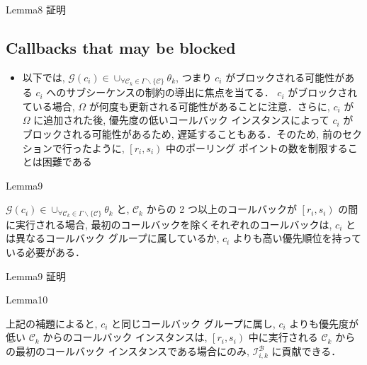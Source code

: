 \begin{frame}{Lemma8 証明}
    \todo{}
\end{frame}


\subsection{Callbacks that may be blocked}
\label{ssec: callbacks_that_may_be_blocked}

\begin{frame}{}
\begin{itemize}
    \item 以下では, $\mathcal{G}\left(c_{i}\right) \in \cup_{\forall \mathcal{C}_{k} \in \Gamma \backslash\{\mathcal{C}\}} \theta_{k}$, つまり $c_{i}$ がブロックされる可能性がある $c_{i}$ へのサブシーケンスの制約の導出に焦点を当てる． $c_{i}$ がブロックされている場合, $\Omega$ が何度も更新される可能性があることに注意．さらに, $c_{i}$ が $\Omega$ に追加された後, 優先度の低いコールバック インスタンスによって $c_{i}$ がブロックされる可能性があるため, 遅延することもある．そのため, 前のセクションで行ったように, $\left[r_{i}, s_{i}\right)$ 中のポーリング ポイントの数を制限することは困難である
\end{itemize}
\end{frame}

\begin{frame}{Lemma9}
\begin{lemma}[]
    $\mathcal{G}\left(c_{i}\right) \in \cup_{\forall \mathcal{C}_{k} \in \Gamma \backslash\{\mathcal{C}\}} \theta_{k}$ と, $\mathcal{C}_{k}$ からの 2 つ以上のコールバックが $\left[r_{i}, s_{i}\right)$ の間に実行される場合, 最初のコールバックを除くそれぞれのコールバックは, $c_{i}$ とは異なるコールバック グループに属しているか, $c_{i}$ よりも高い優先順位を持っている必要がある．
\end{lemma}
\end{frame}

\begin{frame}{Lemma9 証明}
\todo{}
\end{frame}

\begin{frame}{Lemma10}
\begin{lemma}[]
    上記の補題によると, $c_{i}$ と同じコールバック グループに属し, $c_{i}$ よりも優先度が低い $\mathcal{C}_{k}$ からのコールバック インスタンスは, $\left[r_{i}, s_{i}\right)$ 中に実行される $\mathcal{C}_{k}$ からの最初のコールバック インスタンスである場合にのみ, $\mathcal{I}_{i, k}^{\mathcal{B}}$ に貢献できる．
\end{lemma}
\end{frame}
